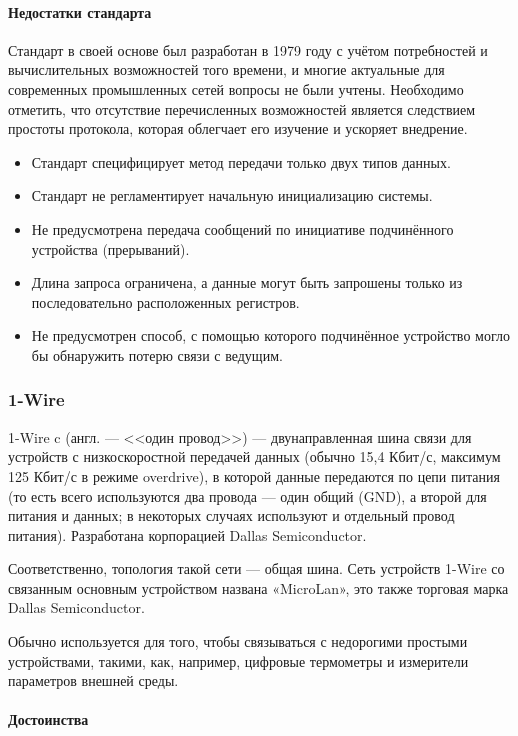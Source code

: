 \documentclass[a4paper,14pt]{extarticle}
\begin{document}
\paragraph*{Недостатки стандарта}
Стандарт в своей основе был разработан в 1979 году с учётом потребностей и вычислительных возможностей того времени, и многие актуальные для современных промышленных сетей вопросы не были учтены. Необходимо отметить, что отсутствие перечисленных возможностей является следствием простоты протокола, которая облегчает его изучение и ускоряет внедрение.

\begin{itemize}
	\item Стандарт специфицирует метод передачи только двух типов данных. 
	\item Стандарт не регламентирует начальную инициализацию системы.
	\item Не предусмотрена передача сообщений по инициативе подчинённого устройства (прерываний). 
	\item Длина запроса ограничена, а данные могут быть запрошены только из последовательно расположенных регистров. 
	\item Не предусмотрен способ, с помощью которого подчинённое устройство могло бы обнаружить потерю связи с ведущим.
\end{itemize}



\subsubsection*{1-Wire}
1-Wire c (англ. --- <<один провод>>) --- двунаправленная шина связи для устройств с низкоскоростной передачей данных (обычно 15,4 Кбит/с, максимум 125 Кбит/с в режиме overdrive), в которой данные передаются по цепи питания (то есть всего используются два провода — один общий (GND), а второй для питания и данных; в некоторых случаях используют и отдельный провод питания). Разработана корпорацией Dallas Semiconductor.

Соответственно, топология такой сети --- общая шина. Сеть устройств 1-Wire со связанным основным устройством названа «MicroLan», это также торговая марка Dallas Semiconductor.

Обычно используется для того, чтобы связываться с недорогими простыми устройствами, такими, как, например, цифровые термометры и измерители параметров внешней среды.

\paragraph*{Достоинства}
\end{document}

